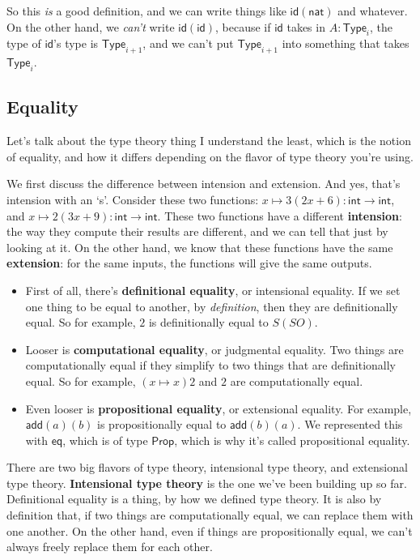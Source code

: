 \documentclass[11pt,paper=letter]{scrartcl}
\renewcommand{\sf}{\mathsf}
\newcommand{\prop}{\mathsf{Prop}}
\newcommand{\type}{\mathsf{Type}}
\begin{document}
So this \emph{is} a good definition, and we can write things like $\sf{id}(\sf{nat})$ and whatever. On the other hand, we \emph{can't} write $\sf{id}(\sf{id})$, because if $\sf{id}$ takes in $A : \type_i$, the type of $\sf{id}$'s type is $\type_{i+1}$, and we can't put $\type_{i+1}$ into something that takes $\type_i$.

\subsection{Equality}

Let's talk about the type theory thing I understand the least, which is the notion of equality, and how it differs depending on the flavor of type theory you're using.

We first discuss the difference between intension and extension. And yes, that's intension with an `s'. Consider these two functions: $x \mapsto 3(2x + 6) : \sf{int} \to \sf{int}$, and $x \mapsto 2(3x + 9) : \sf{int} \to \sf{int}$. These two functions have a different \textbf{intension}: the way they compute their results are different, and we can tell that just by looking at it. On the other hand, we know that these functions have the same \textbf{extension}: for the same inputs, the functions will give the same outputs.

\begin{itemize}
\item First of all, there's \textbf{definitional equality}, or intensional equality. If we set one thing to be equal to another, by \emph{definition}, then they are definitionally equal. So for example, $2$ is definitionally equal to $S(SO)$.

\item Looser is \textbf{computational equality}, or judgmental equality. Two things are computationally equal if they simplify to two things that are definitionally equal. So for example, $(x \mapsto x)2$ and $2$ are computationally equal.

\item Even looser is \textbf{propositional equality}, or extensional equality. For example, $\sf{add}(a)(b)$ is propositionally equal to $\sf{add}(b)(a)$. We represented this with $\sf{eq}$, which is of type $\prop$, which is why it's called propositional equality.
\end{itemize}

There are two big flavors of type theory, intensional type theory, and extensional type theory. \textbf{Intensional type theory} is the one we've been building up so far. Definitional equality is a thing, by how we defined type theory. It is also by definition that, if two things are computationally equal, we can replace them with one another. On the other hand, even if things are propositionally equal, we can't always freely replace them for each other.
\end{document}
